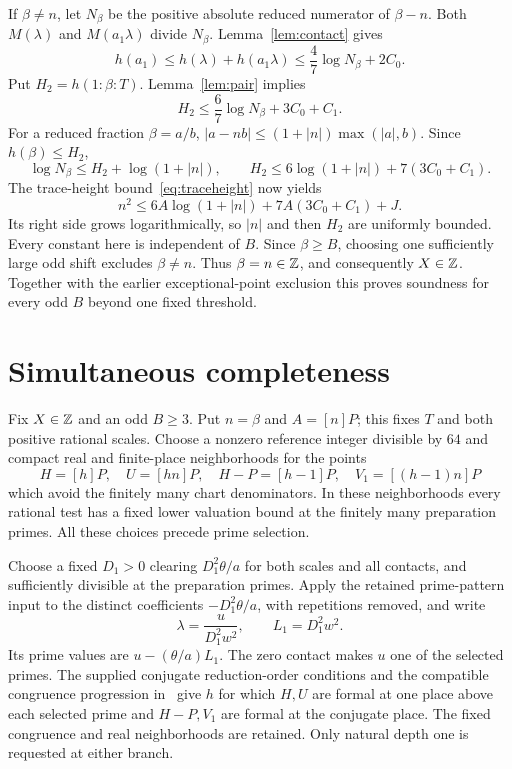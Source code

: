 \documentclass[11pt,a4paper]{article}
\begin{document}
If $\beta\ne n$, let $N_\beta$ be the positive absolute reduced
numerator of $\beta-n$. Both $M(\lambda)$ and $M(a_1\lambda)$ divide
$N_\beta$. Lemma~\ref{lem:contact} gives
\[
 h(a_1)\le h(\lambda)+h(a_1\lambda)
               \le\frac47\log N_\beta+2C_0.
\]
Put $H_2=h(1:\beta:T)$. Lemma~\ref{lem:pair} implies
\[
 H_2\le\frac67\log N_\beta+3C_0+C_1.
\]
For a reduced fraction $\beta=a/b$,
$|a-nb|\le(1+|n|)\max(|a|,b)$. Since $h(\beta)\le H_2$,
\[
 \log N_\beta\le H_2+\log(1+|n|),\qquad
 H_2\le6\log(1+|n|)+7(3C_0+C_1).
\]
The trace-height bound~\eqref{eq:traceheight} now yields
\[
 n^2\le6A\log(1+|n|)+7A(3C_0+C_1)+J.
\]
Its right side grows logarithmically, so $|n|$ and then $H_2$ are
uniformly bounded. Every constant here is independent of $B$.
Since $\beta\ge B$, choosing one sufficiently large odd shift excludes
$\beta\ne n$. Thus $\beta=n\in\mathbb Z$, and consequently $X\in\mathbb Z$.
Together with the earlier exceptional-point exclusion this proves
soundness for every odd $B$ beyond one fixed threshold.

\section{Simultaneous completeness}

Fix $X\in\mathbb Z$ and an odd $B\ge3$. Put $n=\beta$ and $A=[n]P$;
this fixes $T$ and both positive rational scales. Choose a nonzero
reference integer divisible by $64$ and compact real and finite-place
neighborhoods for the points
\[
 H=[h]P,\quad U=[hn]P,\quad H-P=[h-1]P,\quad
 V_1=[(h-1)n]P
\]
which avoid the finitely many chart denominators. In these neighborhoods
every rational test has a fixed lower valuation bound at the finitely
many preparation primes. All these choices precede prime selection.

Choose a fixed $D_1>0$ clearing $D_1^2\theta/a$ for both scales and
all contacts, and sufficiently divisible at the preparation primes.
Apply the retained prime-pattern input to the distinct coefficients
$-D_1^2\theta/a$, with repetitions removed, and write
\[
                \lambda=\frac{u}{D_1^2w^2},\qquad L_1=D_1^2w^2.
\]
Its prime values are $u-(\theta/a)L_1$. The zero contact makes $u$
one of the selected primes. The supplied conjugate reduction-order
conditions and the compatible congruence progression in~\cite{Dependencies}
give $h$ for which $H,U$ are formal at one place above each selected
prime and $H-P,V_1$ are formal at the conjugate place. The fixed
congruence and real neighborhoods are retained. Only natural depth one
is requested at either branch.
\end{document}
